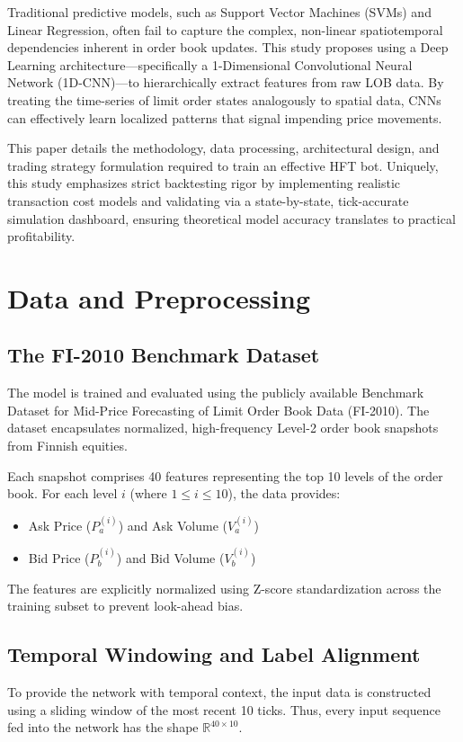 \documentclass[journal]{IEEEtran}
\begin{document}
Traditional predictive models, such as Support Vector Machines (SVMs) and Linear Regression, often fail to capture the complex, non-linear spatiotemporal dependencies inherent in order book updates. This study proposes using a Deep Learning architecture—specifically a 1-Dimensional Convolutional Neural Network (1D-CNN)—to hierarchically extract features from raw LOB data. By treating the time-series of limit order states analogously to spatial data, CNNs can effectively learn localized patterns that signal impending price movements.

This paper details the methodology, data processing, architectural design, and trading strategy formulation required to train an effective HFT bot. Uniquely, this study emphasizes strict backtesting rigor by implementing realistic transaction cost models and validating via a state-by-state, tick-accurate simulation dashboard, ensuring theoretical model accuracy translates to practical profitability.

\section{Data and Preprocessing}
\subsection{The FI-2010 Benchmark Dataset}
The model is trained and evaluated using the publicly available Benchmark Dataset for Mid-Price Forecasting of Limit Order Book Data (FI-2010). The dataset encapsulates normalized, high-frequency Level-2 order book snapshots from Finnish equities. 

Each snapshot comprises 40 features representing the top 10 levels of the order book. For each level $i$ (where $1 \leq i \leq 10$), the data provides:
\begin{itemize}
    \item Ask Price ($P_a^{(i)}$) and Ask Volume ($V_a^{(i)}$)
    \item Bid Price ($P_b^{(i)}$) and Bid Volume ($V_b^{(i)}$)
\end{itemize}

The features are explicitly normalized using Z-score standardization across the training subset to prevent look-ahead bias.

\subsection{Temporal Windowing and Label Alignment}
To provide the network with temporal context, the input data is constructed using a sliding window of the most recent 10 ticks. Thus, every input sequence fed into the network has the shape $\mathbb{R}^{40 \times 10}$.
\end{document}
